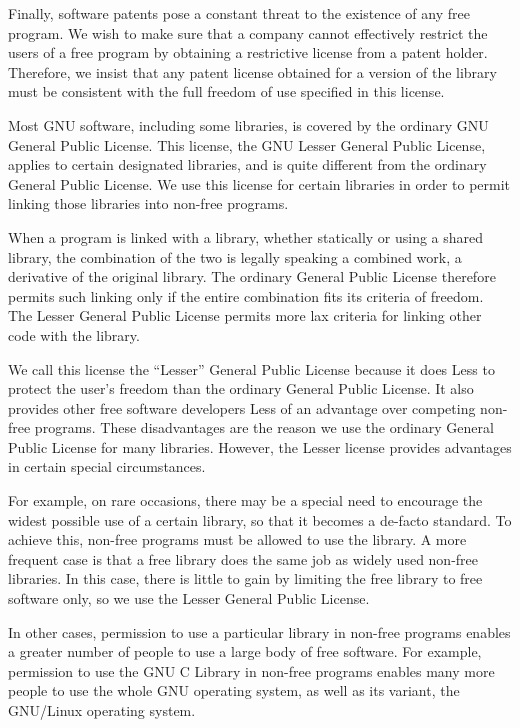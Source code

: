 {{{Finally, software patents pose a constant threat to the existence of any free
program. We wish to make sure that a company cannot effectively restrict the
users of a free program by obtaining a restrictive license from a patent
holder. Therefore, we insist that any patent license obtained for a version of
the library must be consistent with the full freedom of use specified in this
license. 

Most GNU software, including some libraries, is covered by the ordinary GNU
General Public License. This license, the GNU Lesser General Public License,
applies to certain designated libraries, and is quite different from the
ordinary General Public License. We use this license for certain libraries in
order to permit linking those libraries into non-free programs. 

When a program is linked with a library, whether statically or using a shared
library, the combination of the two is legally speaking a combined work, a
derivative of the original library. The ordinary General Public License
therefore permits such linking only if the entire combination fits its
criteria of freedom. The Lesser General Public License permits more lax
criteria for linking other code with the library. 

We call this license the ``Lesser'' General Public License because it does
Less to protect the user's freedom than the ordinary General Public License.
It also provides other free software developers Less of an advantage over
competing non-free programs. These disadvantages are the reason we use the
ordinary General Public License for many libraries. However, the Lesser
license provides advantages in certain special circumstances. 

For example, on rare occasions, there may be a special need to encourage the
widest possible use of a certain library, so that it becomes a de-facto
standard. To achieve this, non-free programs must be allowed to use the
library. A more frequent case is that a free library does the same job as
widely used non-free libraries. In this case, there is little to gain by
limiting the free library to free software only, so we use the Lesser General
Public License. 

In other cases, permission to use a particular library in non-free programs
enables a greater number of people to use a large body of free software. For
example, permission to use the GNU C Library in non-free programs enables many
more people to use the whole GNU operating system, as well as its variant, the
GNU/Linux operating system. 

}}}
